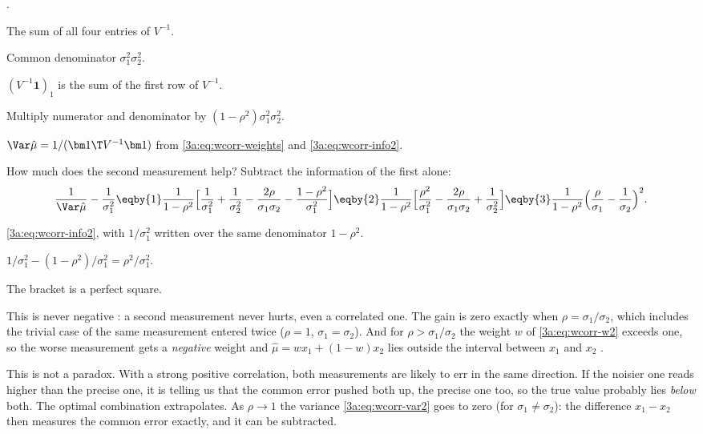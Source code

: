 .
\begin{explain}
  \item The sum of all four entries of $V^{-1}$.
  \item Common denominator $\sigma_1^2\sigma_2^2$.
  \item $(V^{-1}\bm1)_1$ is the sum of the first row of $V^{-1}$.
  \item Multiply numerator and denominator by $(1-\rho^2)\sigma_1^2\sigma_2^2$.
  \item $\Var\hat\mu=1/(\bm1\T V^{-1}\bm1)$ from \eqref{3a:eq:wcorr-weights}
        and \eqref{3a:eq:wcorr-info2}.
\end{explain}

How much does the second measurement help? Subtract the information of the
first alone:
\begin{equation}
  \frac{1}{\Var\hat\mu}-\frac{1}{\sigma_1^2}
  \eqby{1}\frac{1}{1-\rho^2}\Bigl[\frac{1}{\sigma_1^2}+\frac{1}{\sigma_2^2}-\frac{2\rho}{\sigma_1\sigma_2}-\frac{1-\rho^2}{\sigma_1^2}\Bigr]
  \eqby{2}\frac{1}{1-\rho^2}\Bigl[\frac{\rho^2}{\sigma_1^2}-\frac{2\rho}{\sigma_1\sigma_2}+\frac{1}{\sigma_2^2}\Bigr]
  \eqby{3}\frac{1}{1-\rho^2}\Bigl(\frac{\rho}{\sigma_1}-\frac{1}{\sigma_2}\Bigr)^2 .
  \label{3a:eq:wcorr-gain}
\end{equation}
\begin{explain}
  \item \eqref{3a:eq:wcorr-info2}, with $1/\sigma_1^2$ written over the
        same denominator $1-\rho^2$.
  \item $1/\sigma_1^2-(1-\rho^2)/\sigma_1^2=\rho^2/\sigma_1^2$.
  \item The bracket is a perfect square.
\end{explain}
This is never negative : a second measurement never
hurts, even a correlated one. The gain is zero exactly when
$\rho=\sigma_1/\sigma_2$, which includes the trivial case of the same
measurement entered twice ($\rho=1$, $\sigma_1=\sigma_2$). And for
$\rho>\sigma_1/\sigma_2$ the weight $w$ of \eqref{3a:eq:wcorr-w2} exceeds
one, so the worse measurement gets a \emph{negative} weight and
$\hat\mu=wx_1+(1-w)x_2$ lies outside the interval between $x_1$ and $x_2$
.

This is not a paradox. With a strong positive correlation, both measurements
are likely to err in the same direction. If the noisier one reads higher
than the precise one, it is telling us that the common error pushed both up,
the precise one too, so the true value probably lies \emph{below} both. The
optimal combination extrapolates. As $\rho\to1$ the variance
\eqref{3a:eq:wcorr-var2} goes to zero (for $\sigma_1\ne\sigma_2$): the
difference $x_1-x_2$ then measures the common error exactly, and it can be
subtracted.

